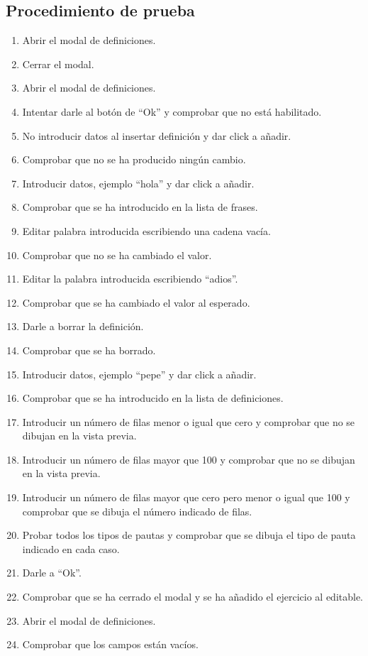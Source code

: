 \subsection{Procedimiento de prueba}
\label{procedimientoPruebas:definiciones}
\begin{enumerate}
    \item Abrir el modal de definiciones.
    \item Cerrar el modal.
    \item Abrir el modal de definiciones.
    \item Intentar darle al botón de ``Ok'' y comprobar que no está habilitado.
    \item No introducir datos al insertar definición y dar click a añadir.
    \item Comprobar que no se ha producido ningún cambio.
    \item Introducir datos, ejemplo ``hola'' y dar click a añadir.
    \item Comprobar que se ha introducido en la lista de frases.
    \item Editar palabra introducida escribiendo una cadena vacía.
    \item Comprobar que no se ha cambiado el valor.
    \item Editar la palabra introducida escribiendo ``adios''.
    \item Comprobar que se ha cambiado el valor al esperado.
    \item Darle a borrar la definición.
    \item Comprobar que se ha borrado.
    \item Introducir datos, ejemplo ``pepe'' y dar click a añadir.
    \item Comprobar que se ha introducido en la lista de definiciones.
    \item Introducir un número de filas menor o igual que cero y comprobar que no se dibujan en la vista previa.
    \item Introducir un número de filas mayor que 100 y comprobar que no se dibujan en la vista previa.
    \item Introducir un número de filas mayor que cero pero menor o igual que 100 y comprobar que se dibuja el número indicado de filas.
    \item Probar todos los tipos de pautas y comprobar que se dibuja el tipo de pauta indicado en cada caso.
    \item Darle a ``Ok''.
    \item Comprobar que se ha cerrado el modal y se ha añadido el ejercicio al editable.
    \item Abrir el modal de definiciones.
    \item Comprobar que los campos están vacíos.
\end{enumerate}

